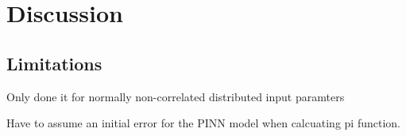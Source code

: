 \chapter{Discussion}
\label{ch:discussion}

\section{Limitations}
Only done it for normally non-correlated distributed input paramters 

Have to assume an initial error for the PINN model when calcuating pi function. 
